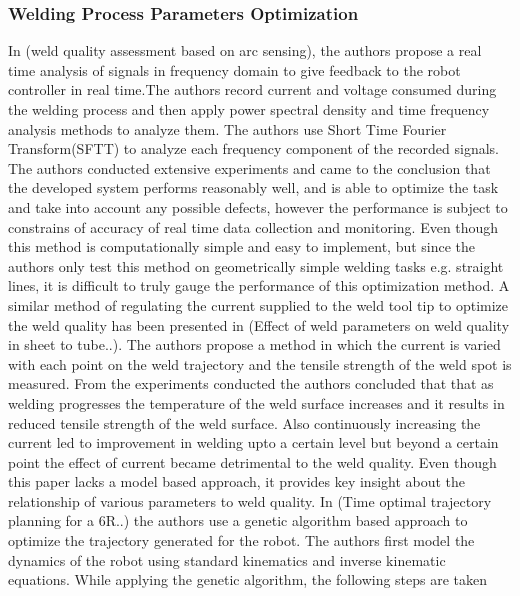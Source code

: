 \subsubsection{Welding Process Parameters Optimization}
In \cite{9}(weld quality assessment based on arc sensing), the authors propose a real time analysis of signals in frequency domain to give feedback to the robot controller in real time.The authors record current and voltage consumed during the welding process and then apply power spectral density and time frequency analysis methods to analyze them. The authors use Short Time Fourier Transform(SFTT) to analyze each frequency component of the recorded signals. The authors conducted extensive experiments and came to the conclusion that the developed system performs reasonably well, and is able to optimize the task and take into account any possible defects, however the performance is subject to constrains of accuracy of real time data collection and monitoring. Even though this method is computationally simple and easy to implement, but since the authors only test this method on geometrically simple welding tasks e.g. straight lines, it is difficult to truly gauge the performance of this optimization method. A similar method of regulating the current supplied to the weld tool tip to optimize the weld quality has been presented in \cite{10}(Effect of weld parameters on weld quality in sheet to tube..). The authors propose a method in which the current is varied with each point on the weld trajectory and the tensile strength of the weld spot is measured. From the experiments conducted the authors concluded that that as welding progresses the temperature of the weld surface increases and it results in reduced tensile strength of the weld surface. Also continuously increasing the current led to improvement in welding upto a certain level but beyond a certain point the effect of current became detrimental to the weld quality. Even though this paper lacks a model based approach, it provides key insight about the relationship of various parameters to weld quality.
In \cite{10}(Time optimal trajectory planning for a 6R..) the authors use a genetic algorithm based approach to optimize the trajectory generated for the robot. The authors first model the dynamics of the robot using standard kinematics and inverse kinematic equations. While applying the genetic algorithm, the following steps are taken
